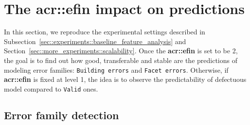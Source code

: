\section{The \acrlong*{acr::efin} impact on predictions}
    \label{sec::more_experiments::finesse}
    In this section, we reproduce the experimental settings described in Subsection~\ref{sec::experiments::baseline_feature_analysis} and Section~\ref{sec::more_experiments::scalability}.
    Once the \textbf{\gls{acr::efin}} is set to be 2, the goal is to find out how good, transferable and stable are the predictions of modeling error families: \texttt{Building errors} and \texttt{Facet errors}.
    Otherwise, if \textbf{\gls{acr::efin}} is fixed at level 1, the idea is to observe the predictability of defectuous model compared to \texttt{Valid} ones.
    
    \subsection{Error family detection}
        \label{subsec::more_experiments::finesse::2}
